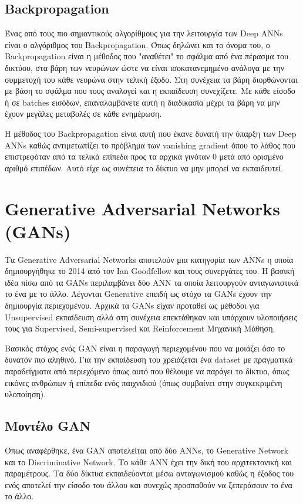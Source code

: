 \subsection{Backpropagation}
Ένας από τους πιο σημαντικούς αλγορίθμους για την λειτουργία των Deep ANNs είναι ο αλγόριθμος του Backpropagation. Όπως δηλώνει και το όνομα του, ο Backpropagation είναι η μέθοδος που "αναθέτει" το σφάλμα από ένα πέρασμα του δικτύου, στα βάρη των νευρώνων ώστε να είναι ισοκατανεμημένο ανάλογα με την συμμετοχή του κάθε νευρώνα στην τελική έξοδο. Στη συνέχεια τα βάρη διορθώνονται με βάση το σφάλμα που τους αναλογεί και η εκπαίδευση συνεχίζετε. Με κάθε είσοδο ή σε batches εισόδων, επαναλαμβάνετε αυτή η διαδικασία μέχρι τα βάρη να μην έχουν μεγάλες μεταβολές σε κάθε ενημέρωση. \cite{backprop}

\par
Η μέθοδος του  Backpropagation είναι αυτή που έκανε δυνατή την ύπαρξη των Deep ANNs καθώς αντιμετωπίζει το πρόβλημα των vanishing gradient όπου το λάθος που επιστρεφόταν από τα τελικά επίπεδα προς τα αρχικά γινόταν 0 μετά από ορισμένο αριθμό επιπέδων. Αυτό είχε ως συνέπεια το δίκτυο να μην μπορεί να εκπαιδευτεί.




\section{Generative Adversarial Networks (GANs)}
Τα Generative Adversarial Networks αποτελούν μια κατηγορία των ANNs η οποία δημιουργήθηκε το 2014 από τον Ian Goodfellow και τους συνεργάτες του. Η βασική ιδέα πίσω από τα GANs περιλαμβάνει δύο ANN τα οποία λειτουργούν ανταγωνιστικά το ένα με το άλλο. Λέγονται Generative επειδή ως στόχο τα GANs έχουν την δημιουργία περιεχομένου. Αρχικά τα GANs είχαν προταθεί ως μέθοδοι για Unsupervised εκπαίδευση αλλά στη συνέχεια επεκτάθηκαν και υπάρχουν υλοποιήσεις τους για Supervised, Semi-supervised και Reinforcement Μηχανική Μάθηση. 
\par
Βασικός στόχος ενός GAN είναι η παραγωγή περιεχομένου που να μοιάζει όσο το δυνατόν πιο αληθινό. Για την εκπαίδευση του χρειάζεται ένα dataset με πραγματικά παραδείγματα από περιεχόμενο όπως αυτό που θέλουμε να παράγει το δίκτυο, όπως εικόνες ανθρώπων ή επίπεδα ενός παιχνιδιού (όπως συμβαίνει στην συγκεκριμένη υλοποίηση). \cite{gan}

\subsection{Μοντέλο GAN}
Όπως αναφέρθηκε, ένα GAN αποτελείται από δύο ΑΝΝs, το Generative Network και το Discriminative Network. Το κάθε ANN έχει την δική του αρχιτεκτονική και παραμέτρους. Τα δύο δίκτυα εκπαιδεύονται μέσω ανταγωνισμού καθώς η έξοδος του ενός αποτελεί την είσοδο του άλλου και συνεχώς προσπαθούν να ξεπεράσουν το ένα το άλλο.



